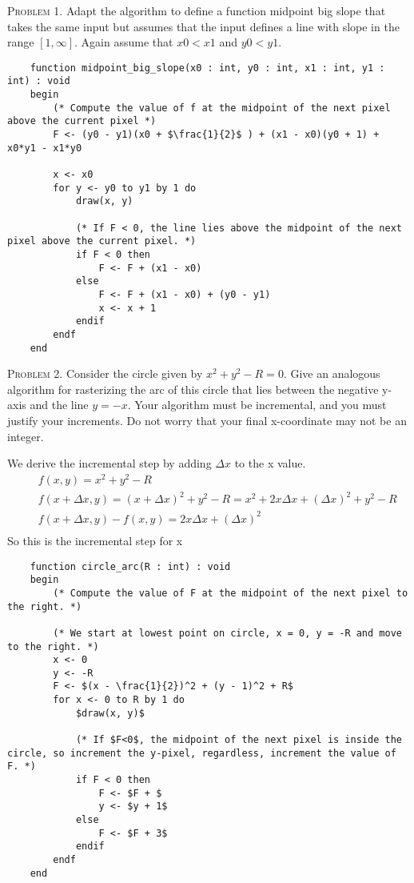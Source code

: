 \documentclass[a4paper, 12pt]{article}
\begin{document}

\textsc{Problem 1.} Adapt the algorithm to define a function midpoint big slope that takes the same input
but assumes that the input defines a line with slope in the range $[1, \infty]$. Again assume that $x0 < x1$
and $y0 < y1$.

\begin{lstlisting}
    function midpoint_big_slope(x0 : int, y0 : int, x1 : int, y1 : int) : void
    begin
        (* Compute the value of f at the midpoint of the next pixel above the current pixel *)
        F <- (y0 - y1)(x0 + $\frac{1}{2}$ ) + (x1 - x0)(y0 + 1) + x0*y1 - x1*y0

        x <- x0
        for y <- y0 to y1 by 1 do
            draw(x, y)

            (* If F < 0, the line lies above the midpoint of the next pixel above the current pixel. *)
            if F < 0 then
                F <- F + (x1 - x0)
            else
                F <- F + (x1 - x0) + (y0 - y1)
                x <- x + 1
            endif
        endf
    end
\end{lstlisting}

\textsc{Problem 2.} Consider the circle given by $x^2 + y^2 - R = 0$. Give an analogous algorithm for
rasterizing the arc of this circle that lies between the negative y-axis and the line $y = −x$. Your
algorithm must be incremental, and you must justify your increments. Do not worry that your
final x-coordinate may not be an integer.

We derive the incremental step by adding $\Delta x$ to the x value.
\begin{eqnarray*}
    && f(x, y) = x^2 + y^2 -R \\
    && f(x + \Delta x, y) = (x + \Delta x)^2 + y^2 -R = x^2 + 2x \Delta x + (\Delta x)^2 + y^2 -R \\
    && f(x + \Delta x, y) - f(x, y) = 2x\Delta x + (\Delta x)^2 \\
\end{eqnarray*}
So this is the incremental step for x
\begin{lstlisting}
    function circle_arc(R : int) : void
    begin
        (* Compute the value of F at the midpoint of the next pixel to the right. *)

        (* We start at lowest point on circle, x = 0, y = -R and move to the right. *)
        x <- 0
        y <- -R
        F <- $(x - \frac{1}{2})^2 + (y - 1)^2 + R$
        for x <- 0 to R by 1 do
            $draw(x, y)$

            (* If $F<0$, the midpoint of the next pixel is inside the circle, so increment the y-pixel, regardless, increment the value of F. *)
            if F < 0 then
                F <- $F + $
                y <- $y + 1$
            else
                F <- $F + 3$
            endif
        endf
    end
        
\end{lstlisting}
\end{document}
